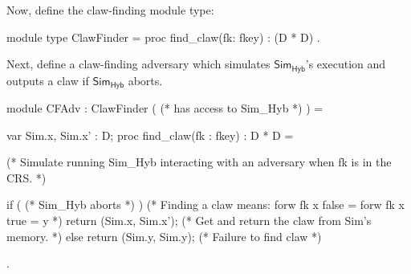 \documentclass{article}[12pt]
\newcommand{\Sim}{{\mathsf{Sim}}} %
\newcommand{\Hyb}{{\mathsf{Hyb}}}
\begin{document}

Now, define the claw-finding module type:

\begin{easycrypt}
module type ClawFinder = {
  proc find_claw(fk: fkey) : (D * D)
}.
\end{easycrypt}

Next, define a claw-finding adversary which simulates $\Sim_\Hyb$'s execution and outputs a claw if $\Sim_\Hyb$ aborts.

\begin{easycrypt}
module CFAdv : ClawFinder ( (* has access to Sim_Hyb *) ) = {
	var Sim.x, Sim.x' : D;
	proc find_claw(fk : fkey) : D * D = {

		(* Simulate running Sim_Hyb interacting with an adversary when fk is in the CRS. *)

		if ( (* Sim_Hyb aborts *) ) {
			(* Finding a claw means: forw fk x false = forw fk x true = y *)
			return (Sim.x, Sim.x'); (* Get and return the claw from Sim's memory. *)
		}
		else {
			return (Sim.y, Sim.y); (* Failure to find claw *)
		}
	}
}.
\end{easycrypt}

{\small{


}}
\end{document}
